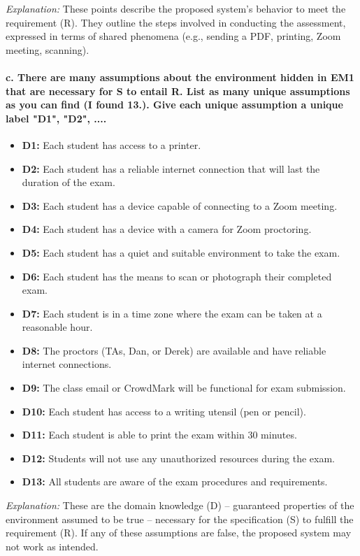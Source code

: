 \documentclass{article}
\begin{document}
\textit{Explanation:} These points describe the proposed system's behavior to meet the requirement (R). They outline the steps involved in conducting the assessment, expressed in terms of shared phenomena (e.g., sending a PDF, printing, Zoom meeting, scanning).

\paragraph{c. There are many assumptions about the environment hidden in EM1 that are necessary for S to entail R. List as many unique assumptions as you can find (I found 13.). Give each unique assumption a unique label "D1", "D2", ....}

\begin{itemize}
    \item \textbf{D1:} Each student has access to a printer.
    \item \textbf{D2:} Each student has a reliable internet connection that will last the duration of the exam.
    \item \textbf{D3:} Each student has a device capable of connecting to a Zoom meeting.
    \item \textbf{D4:} Each student has a device with a camera for Zoom proctoring.
    \item \textbf{D5:} Each student has a quiet and suitable environment to take the exam.
    \item \textbf{D6:} Each student has the means to scan or photograph their completed exam.
    \item \textbf{D7:} Each student is in a time zone where the exam can be taken at a reasonable hour.
    \item \textbf{D8:} The proctors (TAs, Dan, or Derek) are available and have reliable internet connections.
    \item \textbf{D9:} The class email or CrowdMark will be functional for exam submission.
    \item \textbf{D10:} Each student has access to a writing utensil (pen or pencil).
    \item \textbf{D11:} Each student is able to print the exam within 30 minutes.
    \item \textbf{D12:} Students will not use any unauthorized resources during the exam.
    \item \textbf{D13:} All students are aware of the exam procedures and requirements.
\end{itemize}

\textit{Explanation:} These are the domain knowledge (D) – guaranteed properties of the environment assumed to be true – necessary for the specification (S) to fulfill the requirement (R). If any of these assumptions are false, the proposed system may not work as intended.
\end{document}
